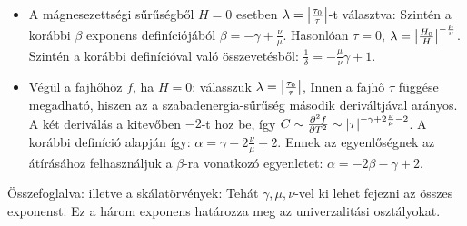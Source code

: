 \begin{itemize}
    \item A mágnesezettségi sűrűségből $H=0$ esetben $\lambda=\left\lvert\frac{\tau_0}{\tau}\right\rvert$-t választva:
    Szintén a korábbi $\beta$ exponens definíciójából $\beta=-\gamma+\frac{\nu}{\mu}$. Hasonlóan $\tau=0$, $
    \lambda=\left\lvert\frac{H_0}{H}\right\rvert^{-\frac{\mu}{\nu}}$.
    Szintén a korábbi definícióval való összevetésből: $\frac{1}{\delta}=-\frac{\mu}{\nu}\gamma+1$.
    
    \item Végül a fajhőhöz $f$, ha $H=0$: válasszuk $\lambda=\left\lvert\frac{\tau_0}{\tau}\right\rvert$,
    Innen a fajhő $\tau$ függése megadható, hiszen az a szabadenergia-sűrűség második deriváltjával arányos. A két deriválás a kitevőben $-2$-t hoz be, így $C\sim\frac{\partial ^2 f}{\partial T^2}\sim \left\lvert\tau\right\rvert^{-\gamma+2\frac{\nu}{\mu}-2}$. A korábbi definíció alapján így: $\alpha=\gamma-2\frac{\nu}{\mu}+2$. Ennek az egyenlőségnek az átírásához felhasználjuk a $\beta$-ra vonatkozó egyenletet: $\alpha=-2\beta-\gamma+2$.
   \end{itemize}
   
   Összefoglalva:
   illetve a skálatörvények:
   Tehát $\gamma,\mu,\nu$-vel ki lehet fejezni az összes exponenst. Ez a három exponens határozza meg az univerzalitási osztályokat. 
